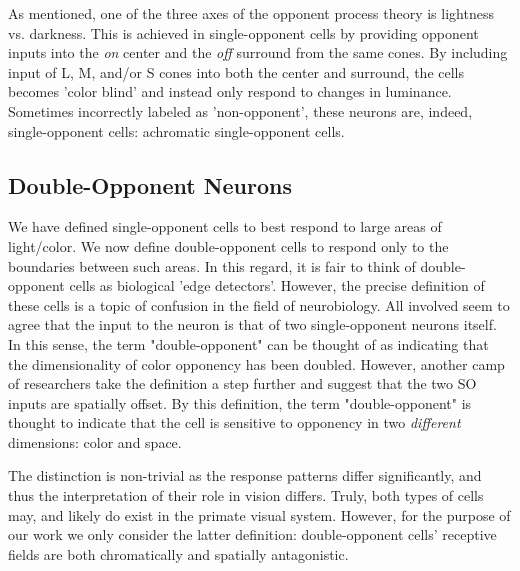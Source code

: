 \documentclass[journal,onecolumn]{IEEEtran}
\begin{document}
As mentioned, one of the three axes of the opponent process theory is lightness vs. darkness. This is achieved in single-opponent cells by providing opponent inputs into the \textit{on} center and the \textit{off} surround from the same cones. By including input of L, M, and/or S cones into both the center and surround, the cells becomes 'color blind' and instead only respond to changes in luminance. Sometimes incorrectly labeled as 'non-opponent', these neurons are, indeed, single-opponent cells: achromatic single-opponent cells.


\subsection*{Double-Opponent Neurons}

We have defined single-opponent cells to best respond to large areas of light/color. We now define double-opponent cells to respond only to the boundaries between such areas. In this regard, it is fair to think of double-opponent cells as biological 'edge detectors'. However, the precise definition of these cells is a topic of confusion in the field of neurobiology. All involved seem to agree that the input to the neuron is that of two single-opponent neurons itself. In this sense, the term "double-opponent" can be thought of as indicating that the dimensionality of color opponency has been doubled. However, another camp of researchers take the definition a step further and suggest that the two SO inputs are spatially offset. By this definition, the term "double-opponent" is thought to indicate that the cell is sensitive to opponency in two \textit{different} dimensions: color and space.

The distinction is non-trivial as the response patterns differ significantly, and thus the interpretation of their role in vision differs. Truly, both types of cells may, and likely do exist in the primate visual system. However, for the purpose of our work we only consider the latter definition: double-opponent cells' receptive fields are both chromatically and spatially antagonistic.
\end{document}
